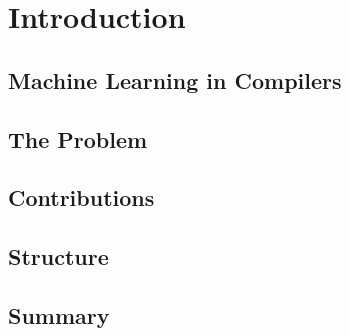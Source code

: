 \chapter{Introduction}

\lipsum[1-2]

\section{Machine Learning in Compilers}

\section{The Problem}

\section{Contributions}

\section{Structure}

\section{Summary}
